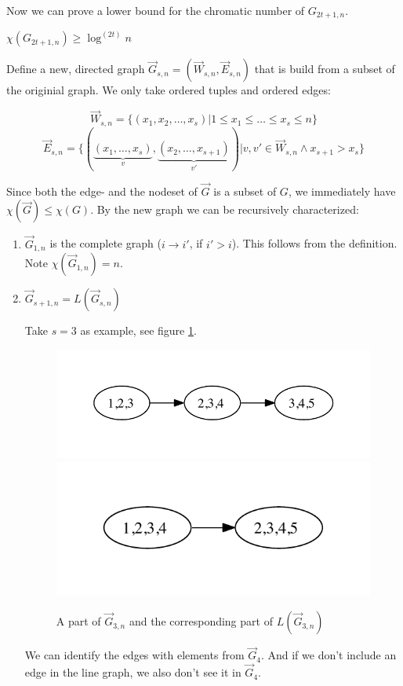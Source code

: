 Now we can prove a lower bound for the chromatic number of $G_{2t+1,n}$.

\begin{lem} \label{lem:vec_g_colours} $\chi(G_{2t+1,n}) \geq \log^{(2t)} n$\end{lem}

\begin{pr} Define a new, directed graph $\vec G_{s,n} = (\vec W_{s,n}, \vec E_{s,n})$ that is build from a subset of the originial graph. We only take ordered tuples and ordered edges:

\[\vec W_{s,n} = \{(x_1,x_2,\ldots,x_s) | 1\leq x_1\leq \ldots \leq x_s \leq n\}\]
\[\vec E_{s,n} = \{(\underbrace{(x_1,\ldots,x_s)}_{v},\underbrace{(x_2,\ldots,x_{s+1})}_{v'})| v,v'\in \vec W_{s,n} \wedge x_{s+1} > x_s\}\]

Since both the edge- and the nodeset of $\vec G$ is a subset of $G$, we immediately have $\chi(\vec G)\leq \chi(G)$. By the new graph we can be recursively characterized:

\begin{enumerate}
\item $\vec G_{1,n}$ is the complete graph ($i\rightarrow i'$, if $i'>i$). This follows from the definition. Note $\chi(\vec G_{1,n})=n$.
\item $\vec G_{s+1,n} = L(\vec G_{s,n})$

Take $s=3$ as example, see figure \ref{fig:g3_l3}.

\begin{figure}[hbt]
\begin{center}
\includegraphics[width=0.58\linewidth]{./images/g3_extr} \includegraphics[width=0.4\linewidth]{./images/L(G3)}
\end{center}
\caption{A part of $\vec G_{3,n}$ and the corresponding part of $L(\vec G_{3,n})$}
\label{fig:g3_l3}
\end{figure}

We can identify the edges with elements from $\vec G_4$. And if we don't include an edge in the line graph, we also don't see it in $\vec G_4$.


\end{enumerate}
\end{pr}
